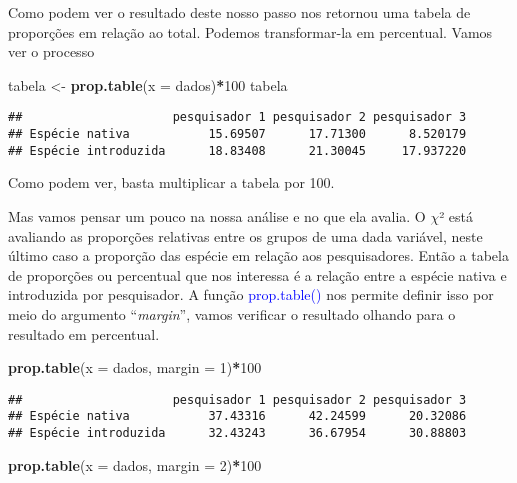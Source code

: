 \documentclass[14pt,titlepage, oneside, openany, a4paper]{book}
\newenvironment{Shaded}{\begin{snugshade}}{\end{snugshade}}
\newcommand{\DataTypeTok}[1]{\textcolor[rgb]{0.13,0.29,0.53}{#1}}
\newcommand{\DecValTok}[1]{\textcolor[rgb]{0.00,0.00,0.81}{#1}}
\newcommand{\KeywordTok}[1]{\textcolor[rgb]{0.13,0.29,0.53}{\textbf{#1}}}
\newcommand{\NormalTok}[1]{#1}
\newcommand{\OperatorTok}[1]{\textcolor[rgb]{0.81,0.36,0.00}{\textbf{#1}}}
\newcommand{\StringTok}[1]{\textcolor[rgb]{0.31,0.60,0.02}{#1}}
\begin{document}
Como podem ver o resultado deste nosso passo nos retornou uma tabela de proporções em relação ao total. Podemos transformar-la em percentual. Vamos ver o processo

\begin{Shaded}
\begin{Highlighting}[]
\NormalTok{tabela <-}\StringTok{ }\KeywordTok{prop.table}\NormalTok{(}\DataTypeTok{x =}\NormalTok{ dados)}\OperatorTok{*}\DecValTok{100}
\NormalTok{tabela}
\end{Highlighting}
\end{Shaded}

\begin{verbatim}
##                     pesquisador 1 pesquisador 2 pesquisador 3
## Espécie nativa           15.69507      17.71300      8.520179
## Espécie introduzida      18.83408      21.30045     17.937220
\end{verbatim}

Como podem ver, basta multiplicar a tabela por 100.

Mas vamos pensar um pouco na nossa análise e no que ela avalia. O \(\chi\)² está avaliando as proporções relativas entre os grupos de uma dada variável, neste último caso a proporção das espécie em relação aos pesquisadores. Então a tabela de proporções ou percentual que nos interessa é a relação entre a espécie nativa e introduzida por pesquisador. A função \textcolor{blue}{prop.table()} nos permite definir isso por meio do argumento ``\emph{margin}'', vamos verificar o resultado olhando para o resultado em percentual.

\begin{Shaded}
\begin{Highlighting}[]
\KeywordTok{prop.table}\NormalTok{(}\DataTypeTok{x =}\NormalTok{ dados, }\DataTypeTok{margin =} \DecValTok{1}\NormalTok{)}\OperatorTok{*}\DecValTok{100}
\end{Highlighting}
\end{Shaded}

\begin{verbatim}
##                     pesquisador 1 pesquisador 2 pesquisador 3
## Espécie nativa           37.43316      42.24599      20.32086
## Espécie introduzida      32.43243      36.67954      30.88803
\end{verbatim}

\begin{Shaded}
\begin{Highlighting}[]
\KeywordTok{prop.table}\NormalTok{(}\DataTypeTok{x =}\NormalTok{ dados, }\DataTypeTok{margin =} \DecValTok{2}\NormalTok{)}\OperatorTok{*}\DecValTok{100}
\end{Highlighting}
\end{Shaded}
\end{document}
